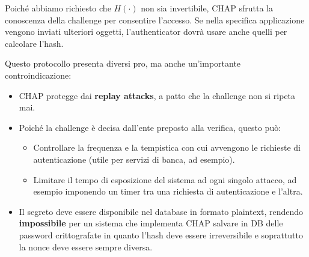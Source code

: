 \begin{note}
Poiché abbiamo richiesto che $H(\cdot)$ non sia invertibile, CHAP sfrutta la conoscenza della challenge per consentire l'accesso. Se nella specifica applicazione vengono inviati ulteriori oggetti, l'authenticator dovrà usare anche quelli per calcolare l'hash.
\end{note}
Questo protocollo presenta diversi pro, ma anche un'importante controindicazione:
\begin{itemize}
    \item [\textcolor{green}{\checkmark}]CHAP protegge dai \textbf{replay attacks}, a patto che la challenge non si ripeta mai.
    \item [\textcolor{green}{\checkmark}]Poiché la challenge è decisa dall'ente preposto alla verifica, questo può:
    \begin{itemize}
        \item Controllare la frequenza e la tempistica con cui avvengono le richieste di autenticazione (utile per servizi di banca, ad esempio).
        \item Limitare il tempo di esposizione del sistema ad ogni singolo attacco, ad esempio imponendo un timer tra una richiesta di autenticazione e l'altra.
    \end{itemize}
    \item [\textcolor{red}{\ding{55}}]Il segreto deve essere disponibile nel database in formato plaintext, rendendo \textbf{impossibile} per un sistema che implementa CHAP salvare in DB delle password crittografate in quanto l'hash deve essere irreversibile e soprattutto la nonce deve essere sempre diversa.
\end{itemize}
